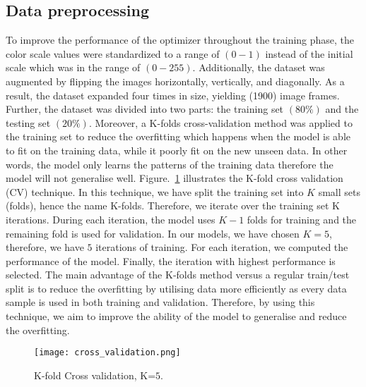 \subsection{Data preprocessing}
To improve the performance of the optimizer throughout the training phase, the color scale values were standardized to a range of \((0-1)\) instead of the initial scale which was in the range of \((0 - 255)\).
Additionally, the dataset was augmented by flipping the images horizontally, vertically, and diagonally.
As a result, the dataset expanded four times in size, yielding (1900) image frames.
Further, the dataset was divided into two parts: the training set $(80\%)$ and the testing set $(20\%)$.
Moreover, a K-folds cross-validation method was applied to the training set to reduce the overfitting which happens when the model is able to fit on the training data, while it poorly fit on the new unseen data.
In other words, the model only learns the patterns of the training data therefore the model will not generalise well. 
Figure.~\ref{fig:Cross_validation} illustrates the K-fold cross validation (CV) technique.
In this technique, we have split the training set into \(K\) small sets (folds), hence the name K-folds. 
Therefore, we iterate over the training set K iterations.
During each iteration, the model uses \(K-1\) folds for training and the remaining fold is used for validation. 
In our models, we have chosen \(K=5\), therefore, we have \(5\) iterations of training. 
For each iteration, we computed the performance of the model.
Finally, the iteration with highest performance is selected.
The main advantage of the K-folds method versus a regular train/test split is to reduce the overfitting by utilising data more efficiently as every data sample is used in both training and validation. 
Therefore, by using this technique, we aim to improve the ability of the model to generalise and reduce the overfitting.
\begin{figure}
	\centering
	\texttt{[image: cross\_validation.png]}
	\caption{K-fold Cross validation, K=\(5\).}
	\label{fig:Cross_validation}
\end{figure}


